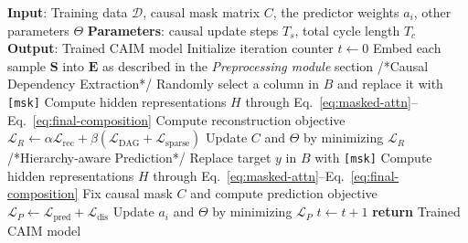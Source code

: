 \documentclass[sigconf, nonacm]{acmart}
\newcommand{\rem}[1]{{\color{black}#1}}
\newcommand{\vldb}[1]{{\color{red}#1}}
\newcommand*{\ourmodel}{CAIM}
\begin{document}
\begin{algorithm}[h]
    \caption{Lazy \vldb{Update} of \ourmodel{}}
    \label{alg:lazy_update}
    \small
    \begin{algorithmic}[1]
        \STATE \textbf{Input}: Training data $\mathcal{D}$, causal mask matrix $C$, the predictor weights $a_i$, other parameters $\Theta$
        \STATE \textbf{Parameters}: causal update steps $T_s$, total cycle length $T_c$
        \STATE \textbf{Output}: Trained \ourmodel{} model
        \STATE Initialize iteration counter $t \leftarrow 0$
            \STATE Embed each sample $\mathbf{S}$ into $\mathbf{E}$ as described in the \textit{Preprocessing module} section
                \STATE /*Causal Dependency Extraction*/
                \STATE Randomly select a column in $B$ and replace it with \texttt{[msk]}
                \STATE Compute hidden representations $H$ through Eq.~\ref{eq:masked-attn}--Eq.~\ref{eq:final-composition}
                \STATE Compute reconstruction objective $\mathcal{L}_R \leftarrow \alpha \mathcal{L}_{\text{rec}} + \beta(\mathcal{L}_{\text{DAG}} + \mathcal{L}_{\text{sparse}})$
                \STATE Update $C$ and $\Theta$ by minimizing $\mathcal{L}_R$
            \ELSE
                \STATE /*Hierarchy-aware Prediction*/
                \STATE Replace target $y$ in $B$ with \texttt{[msk]}
                \STATE Compute hidden representations $H$ through Eq.~\ref{eq:masked-attn}--Eq.~\ref{eq:final-composition}
                \STATE Fix causal mask $C$ and compute prediction objective $\mathcal{L}_P \leftarrow \mathcal{L}_{\text{pred}} + \mathcal{L}_{\text{dis}}$
                \STATE Update $a_i$ and $\Theta$ by minimizing $\mathcal{L}_P$
            \ENDIF
            \STATE $t \leftarrow t + 1$
        \ENDFOR
        \STATE \textbf{return} Trained \ourmodel{} model
    \end{algorithmic}
\end{algorithm}


 
\end{document}
